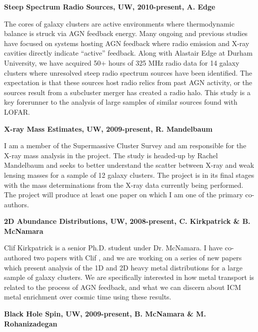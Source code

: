 \documentclass[12pt]{cv}
\begin{document}
{\bfseries{Steep Spectrum Radio Sources, UW, 2010-present, A. Edge}}

The cores of galaxy clusters are active environments where
thermodynamic balance is struck via AGN feedback energy. Many ongoing
and previous studies have focused on systems hosting AGN feedback
where radio emission and X-ray cavities directly indicate ``active''
feedback. Along with Alastair Edge at Durham University, we have
acquired 50+ hours of 325 MHz radio data for 14 galaxy clusters where
unresolved steep radio spectrum sources have been identified. The
expectation is that these sources host radio relics from past AGN
activity, or the sources result from a subcluster merger has created a
radio halo. This study is a key forerunner to the analysis of large
samples of similar sources found with LOFAR.

{\bfseries{X-ray Mass Estimates, UW, 2009-present, R. Mandelbaum}}

I am a member of the Supermassive Cluster Survey and am responsible
for the X-ray mass analysis in the project. The study is headed-up by
Rachel Mandelbaum and seeks to better understand the scatter between
X-ray and weak lensing masses for a sample of 12 galaxy clusters. The
project is in its final stages with the mass determinations from the
X-ray data currently being performed. The project will produce at
least one paper on which I am one of the primary co-authors.

{\bfseries{2D Abundance Distributions, UW, 2008-present, C. Kirkpatrick \& B. McNamara}}

Clif Kirkpatrick is a senior Ph.D. student under Dr. McNamara. I have
co-authored two papers with Clif \cite{a1664, hydrametal}, and we are
working on a series of new papers which present analysis of the 1D and
2D heavy metal distributions for a large sample of galaxy clusters. We
are specifically interested in how metal transport is related to the
process of AGN feedback, and what we can discern about ICM metal
enrichment over cosmic time using these results.

{\bfseries{Black Hole Spin, UW, 2009-present, B. McNamara \& M. Rohanizadegan}}
\end{document}
